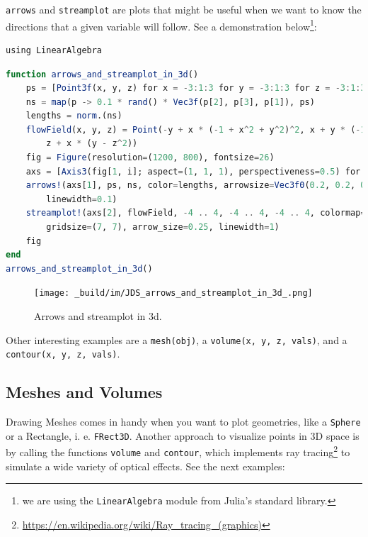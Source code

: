 \documentclass[
  notoc %
]{tufte-book}
\DeclareRobustCommand{\href}[2]{#2\footnote{\url{#1}}}
\newcommand{\passthrough}[1]{#1}
\begin{document}
\passthrough{\lstinline!arrows!} and
\passthrough{\lstinline!streamplot!} are plots that might be useful when
we want to know the directions that a given variable will follow. See a
demonstration below\footnote{we are using the
  \passthrough{\lstinline!LinearAlgebra!} module from Julia's standard
  library.}:

\begin{lstlisting}
using LinearAlgebra
\end{lstlisting}

\begin{lstlisting}[language=Julia]
function arrows_and_streamplot_in_3d()
    ps = [Point3f(x, y, z) for x = -3:1:3 for y = -3:1:3 for z = -3:1:3]
    ns = map(p -> 0.1 * rand() * Vec3f(p[2], p[3], p[1]), ps)
    lengths = norm.(ns)
    flowField(x, y, z) = Point(-y + x * (-1 + x^2 + y^2)^2, x + y * (-1 + x^2 + y^2)^2,
        z + x * (y - z^2))
    fig = Figure(resolution=(1200, 800), fontsize=26)
    axs = [Axis3(fig[1, i]; aspect=(1, 1, 1), perspectiveness=0.5) for i = 1:2]
    arrows!(axs[1], ps, ns, color=lengths, arrowsize=Vec3f0(0.2, 0.2, 0.3),
        linewidth=0.1)
    streamplot!(axs[2], flowField, -4 .. 4, -4 .. 4, -4 .. 4, colormap=:plasma,
        gridsize=(7, 7), arrow_size=0.25, linewidth=1)
    fig
end
arrows_and_streamplot_in_3d()
\end{lstlisting}

\begin{figure}
\hypertarget{fig:arrows_and_streamplot_in_3d}{%
\centering
\texttt{[image: \_build/im/JDS\_arrows\_and\_streamplot\_in\_3d\_.png]}
\caption{Arrows and streamplot in
3d.}\label{fig:arrows_and_streamplot_in_3d}
}
\end{figure}

Other interesting examples are a \passthrough{\lstinline!mesh(obj)!}, a
\passthrough{\lstinline!volume(x, y, z, vals)!}, and a
\passthrough{\lstinline!contour(x, y, z, vals)!}.

\hypertarget{meshes-and-volumes}{%
\subsection{Meshes and Volumes}\label{meshes-and-volumes}}

Drawing Meshes comes in handy when you want to plot geometries, like a
\passthrough{\lstinline!Sphere!} or a Rectangle, i. e.
\passthrough{\lstinline!FRect3D!}. Another approach to visualize points
in 3D space is by calling the functions \passthrough{\lstinline!volume!}
and \passthrough{\lstinline!contour!}, which implements
\href{https://en.wikipedia.org/wiki/Ray_tracing_(graphics)}{ray tracing}
to simulate a wide variety of optical effects. See the next examples:
\end{document}
